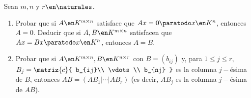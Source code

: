 \begin{enunciado}{\ejercicio}
  Sean $m, n$ y $r \en \naturales$.
  \begin{enumerate}[label=(\alph*)]
    \item Probar que si $A \en K^{m \times n}$ satisface que $Ax = 0  \paratodo x \en K^n$, entonces $A=0$.
          Deducir que si $A,B \en K^{m \times n}$ satisfacen que $Ax = Bx \paratodo x \en K^n$, entonces $A = B$.

    \item Probar que si $A \en K^{m \times n}, B \en K^{n \times r}$ con $B = (b_{ij})$ y, para $1 \leq j \leq r$,
          $B_j =
            \matriz{c}{
              b_{ij}\\
              \vdots\\
              b_{nj}
            }
          $
          es la columna $j-$ésima de $B$, entonces $AB = (AB_1 | \cdots | AB_r)$ (es decir, $AB_j$ es la columna $j-$ésima de $AB$).
  \end{enumerate}
\end{enunciado}

